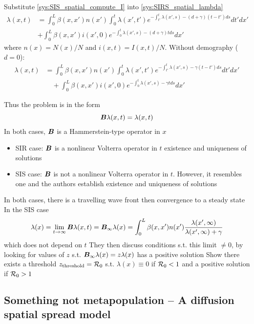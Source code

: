 \documentclass[aspectratio=169]{beamer}\usepackage[]{graphicx}\usepackage[]{xcolor}
\begin{document}
\begin{frame}
Substitute \eqref{sys:SIS_spatial_compute_I} into \eqref{sys:SIRS_spatial_lambda}
\[
\begin{aligned}
\lambda(x,t) &=
\int_0^L \beta(x,x')n(x')
\int_0^t \lambda(x',t')
e^{-\int_{t'}^t \lambda(x',s)-(d+\gamma)(t-t')ds}dt'dx' \\
&+\int_0^L \beta(x,x')i(x',0)
e^{-\int_0^t \lambda(x',s)-(d+\gamma)t ds}dx'
\end{aligned}
\]
where $n(x)=N(x)/N$ and $i(x,t)=I(x,t)/N$. Without demography ($d=0$):
\[
\begin{aligned}
\lambda(x,t) &=
\int_0^L \beta(x,x')n(x')
\int_0^t \lambda(x',t')
e^{-\int_{t'}^t \lambda(x',s)-\gamma(t-t')ds}dt'dx' \\
&\quad +\int_0^L \beta(x,x')i(x',0)
e^{-\int_0^t \lambda(x',s)-\gamma t ds}dx'
\end{aligned}
\]
\end{frame}


\begin{frame}
Thus the problem is in the form
\[
\bm{B}\lambda(x,t)=\lambda(x,t)
\]
\vfill
In both cases, $\bm{B}$ is a Hammerstein-type operator in $x$
\vfill
\begin{itemize}
\item SIR case: $\bm{B}$ is a nonlinear Volterra operator in $t$ \imply existence and uniqueness of solutions
\vfill
\item SIS case: $\bm{B}$ is not a nonlinear Volterra operator in $t$. However, it resembles one and the authors establish existence and uniqueness of solutions
\end{itemize}
\end{frame}


\begin{frame}
In both cases, there is a travelling wave front then convergence to a steady state
\vfill
In the SIS case
\[
\lambda(x)=\lim_{t\to\infty}\bm{B}\lambda(x,t)
=\bm{B}_\infty\lambda(x)=
\int_0^L\beta(x,x')n(x')
\frac{\lambda(x',\infty)}{\lambda(x',\infty)+\gamma}
\]
which does not depend on $t$
\vfill 
They then discuss conditions s.t. this limit $\neq 0$, by looking for values of $z$ s.t. $\bm{B}_\infty\lambda(x)=z\lambda(x)$ has a positive solution
\vfill
Show there exists a threshold $z_{\text{threshold}}=\mathcal{R}_0$ s.t. $\lambda(x)\equiv 0$ if $\mathcal{R}_0<1$ and a positive solution if $\mathcal{R}_0>1$
\end{frame}


\subsection{Something not metapopulation -- A diffusion spatial spread model}
\end{document}

